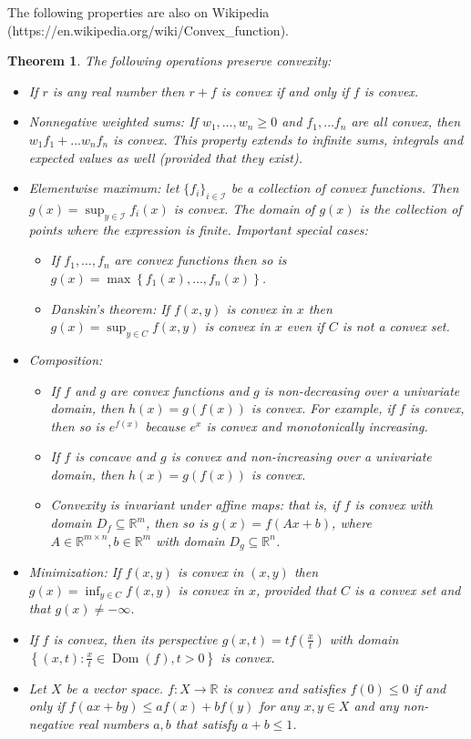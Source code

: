 \documentclass{article}
\newtheorem{theorem}{Theorem}[section]
\begin{document}
The following properties are also on Wikipedia (https://en.wikipedia.org/wiki/Convex\_function).
\begin{theorem}
The following operations preserve convexity:
\begin{itemize}
	\item If $r$ is any real number then $r+f$ is convex if and only if $f$ is convex.
	\item Nonnegative weighted sums: If $w_1, \dots, w_n\geq 0$ and $f_1, \dots f_n$ are all convex, then $w_1f_1 + \dots w_n f_n$ is convex. This property extends to infinite sums, integrals and expected values as well (provided that they exist).
	\item Elementwise maximum: let $\{f_i\}_{i\in\mathcal{I}}$ be a collection of convex functions. Then $g(x) = \sup_{y\in\mathcal{I}}f_i(x)$ is convex.   The domain of $g(x)$ is the collection of points where the expression is finite. Important special cases:
		\begin{itemize}
			\item If $f_{1},\ldots ,f_{n}$ are convex functions then so is 
				$g(x)=\max \left\{ f_{1}(x), \ldots, f_{n}(x) \right\}$.
			\item Danskin's theorem: If $f(x,y)$ is convex in $x$ then $g(x)=\sup \nolimits _{y\in C}f(x,y)$ is convex in $x$ even if $C$ is not a convex set.
		\end{itemize}
	\item Composition: 
		\begin{itemize} 
			\item If $f$  and $g$ are convex functions and $g$ is non-decreasing over a univariate domain, then $h(x)=g(f(x))$ is convex. For example, if $f$ is convex, then so is $e^{f(x)}$ because $e^{x}$ is convex and monotonically increasing.
			\item If $f$ is concave and $g$ is convex and non-increasing over a univariate domain, then $h(x)=g(f(x))$ is convex.
			\item Convexity is invariant under affine maps: that is, if $f$ is convex with domain $D_{f}\subseteq \mathbb{R}^{m}$, then so is $g(x)=f(Ax+b)$, where $A\in \mathbb{R}^{m\times n}, b\in \mathbb{R}^{m}$ with domain $D_{g}\subseteq \mathbb{R}^{n}$.
		\end{itemize}
	\item Minimization: If $f(x,y)$ is convex in $(x,y)$ then $g(x)=\inf \nolimits _{y\in C}f(x,y)$ is convex in $x$, provided that $C$ is a convex set and that $g(x)\neq -\infty$.
	\item If $f$ is convex, then its perspective $g(x,t)=tf\left({\tfrac {x}{t}}\right)$ with domain $\left\{(x,t):{\tfrac {x}{t}}\in \operatorname {Dom} (f),t>0\right\}$ is convex.
	\item Let $X$ be a vector space. $f:X\to \mathbb{R}$ is convex and satisfies $f(0)\leq 0$ if and only if $f(ax+by)\leq af(x)+bf(y)$ for any $x, y \in X$ and any non-negative real numbers $a,b$ that satisfy $a+b\leq 1$.	
 	
\end{itemize}

\end{theorem}
\end{document}
